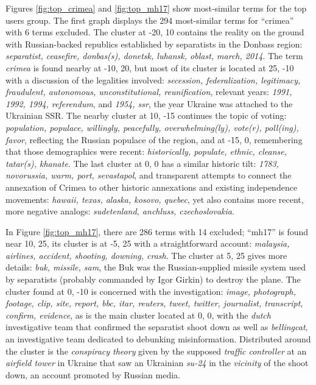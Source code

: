 Figures \ref{fig:top_crimea} and \ref{fig:top_mh17} show most-similar terms for the top users group.
The first graph displays the 294 most-similar terms for ``crimea'' with 6 terms excluded.
The cluster at -20, 10 contains the reality on the ground with Russian-backed republics established by separatists in the Donbass region: \emph{separatist, ceasefire, donbas(s), donetsk, luhansk, oblast, march, 2014}.
The term \emph{crimea} is found nearby at -10, 20, but most of its cluster is located at 25, -10 with a discussion of the legalities involved: \emph{secession, federalization, legitimacy, fraudulent, autonomous, unconstitutional, reunification}, relevant years: \emph{1991, 1992, 1994, referendum}, and \emph{1954, ssr}, the year Ukraine was attached to the Ukrainian SSR.
The nearby cluster at 10, -15 continues the topic of voting: \emph{population, populace, willingly, peacefully, overwhelming(ly), vote(r), poll(ing), favor}, reflecting the Russian populace of the region, and at -15, 0, remembering that those demographics were recent: \emph{historically, populate, ethnic, cleanse, tatar(s), khanate}.
The last cluster at 0, 0 has a similar historic tilt: \emph{1783, novorussia, warm, port, sevastapol}, and transparent attempts to connect the annexation of Crimea to other historic annexations and existing independence movements: \emph{hawaii, texas, alaska, kosovo, quebec}, yet also contains more recent, more negative analogs: \emph{sudetenland, anchluss, czechoslovakia}.

In Figure \ref{fig:top_mh17}, there are 286 terms with 14 excluded; ``mh17'' is found near 10, 25, its cluster is at -5, 25 with a straightforward account: \emph{malaysia, airlines, accident, shooting, downing, crash}.
The cluster at 5, 25 gives more details: \emph{buk, missile, sam}, the Buk was the Russian-supplied missile system used by separatists (probably commanded by Igor Girkin) to destroy the plane.
The cluster found at 0, -10 is concerned with the investigation: \emph{image, photograph, footage, clip, site, report, bbc, itar, reuters, tweet, twitter, journalist, transcript, confirm, evidence}, as is the main cluster located at 0, 0, with the \emph{dutch} investigative team that confirmed the separatist shoot down as well as \emph{bellingcat}, an investigative team dedicated to debunking misinformation.
Distributed around the cluster is the \emph{conspiracy theory} given by the supposed \emph{traffic controller} at an \emph{airfield tower} in Ukraine that saw an Ukrainian \emph{su-24} in the \emph{vicinity} of the shoot down, an account promoted by Russian media.

